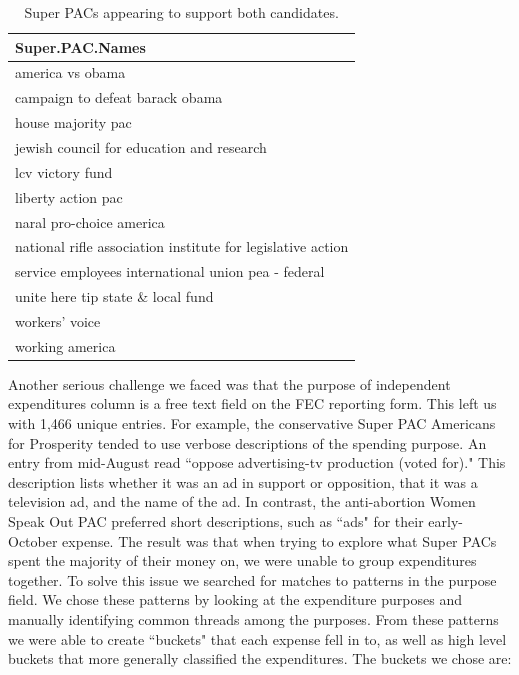 \documentclass[11pt]{article}\usepackage{graphicx, color}
\begin{document}
\begin{table}[ht]
\begin{center}
\begin{tabular}{l}
  \hline
Super.PAC.Names \\ 
  \hline
america vs obama \\ 
  campaign to defeat barack obama \\ 
  house majority pac \\ 
  jewish council for education and research \\ 
  lcv victory fund \\ 
  liberty action pac \\ 
  naral pro-choice america \\ 
  national rifle association institute for legislative action \\ 
  service employees international union pea - federal \\ 
  unite here tip state \& local fund \\ 
  workers' voice \\ 
  working america \\ 
   \hline
\end{tabular}
\caption{Super PACs appearing to support both candidates.}
\label{tab:prob_spe}
\end{center}
\end{table}



Another serious challenge we faced was that the purpose of independent expenditures column is a free text field on the FEC reporting form.  This left us with 1,466 unique entries. For example, the conservative Super PAC Americans for Prosperity tended to use verbose descriptions of the spending purpose. An entry from mid-August read ``oppose advertising-tv production (voted for)." This description lists whether it was an ad in support or opposition, that it was a television ad, and the name of the ad. In contrast, the anti-abortion Women Speak Out PAC preferred short descriptions, such as ``ads" for their early-October expense. The result was that when trying to explore what Super PACs spent the majority of their money on, we were unable to group expenditures together. To solve this issue we searched for matches to patterns in the purpose field. We chose these patterns by looking at the expenditure purposes and manually identifying common threads among the purposes. From these patterns we were able to create ``buckets" that each expense fell in to, as well as high level buckets that more generally classified the expenditures. The buckets we chose are: 
\end{document}
